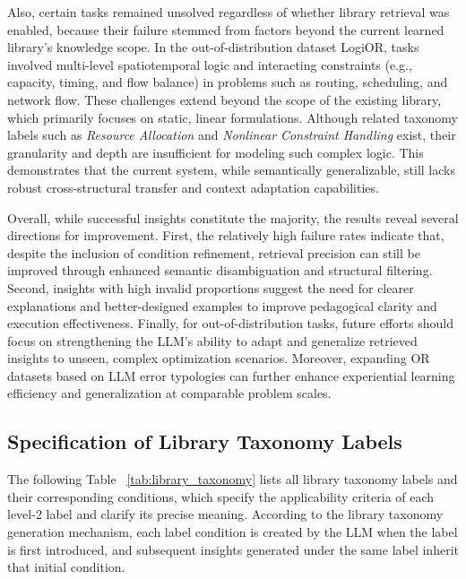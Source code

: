 \documentclass[sigconf, nonacm]{acmart}
\begin{document}
Also, certain tasks remained unsolved regardless of whether library retrieval was enabled, because their failure stemmed from factors beyond the current learned library’s knowledge scope. In the out-of-distribution dataset LogiOR, tasks involved multi-level spatiotemporal logic and interacting constraints (e.g., capacity, timing, and flow balance) in problems such as routing, scheduling, and network flow. These challenges extend beyond the scope of the existing library, which primarily focuses on static, linear formulations. Although related taxonomy labels such as \emph{Resource Allocation} and \emph{Nonlinear Constraint Handling} exist, their granularity and depth are insufficient for modeling such complex logic. This demonstrates that the current system, while semantically generalizable, still lacks robust cross-structural transfer and context adaptation capabilities.

Overall, while successful insights constitute the majority, the results reveal several directions for improvement. First, the relatively high failure rates indicate that, despite the inclusion of condition refinement, retrieval precision can still be improved through enhanced semantic disambiguation and structural filtering. Second, insights with high invalid proportions suggest the need for clearer explanations and better-designed examples to improve pedagogical clarity and execution effectiveness. Finally, for out-of-distribution tasks, future efforts should focus on strengthening the LLM’s ability to adapt and generalize retrieved insights to unseen, complex optimization scenarios. Moreover, expanding OR datasets based on LLM error typologies can further enhance experiential learning efficiency and generalization at comparable problem scales.

\subsection{Specification of Library Taxonomy Labels\label{appendix:taxonomy}}

The following Table ~\ref{tab:library_taxonomy} lists all library taxonomy labels and their corresponding conditions, which specify the applicability criteria of each level-2 label and clarify its precise meaning. According to the library taxonomy generation mechanism, each label condition is created by the LLM when the label is first introduced, and subsequent insights generated under the same label inherit that initial condition.
\end{document}
